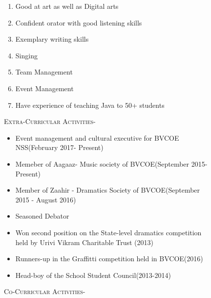 \documentclass[11pt]{article}
\begin{document}
\begin{figure}[ht]
\begin{minipage}[b]{0.45\linewidth}
\begin{small}
\begin{enumerate}
\item Good at art as well as Digital arts
\item Confident orator with good listening skills
\item Exemplary writing skills
\item Singing
\item Team Management
\item Event Management
\item Have experience of teaching Java to 50+ students
\end{enumerate}
\end{small}
\noindent\colorbox{WeakOrange}
{\parbox{\dimexpr\textwidth-2\fboxsep\relax}{\textsc{Extra-Curricular Activities-}}}
\begin{small}
\begin{itemize}
\item Event management and cultural executive for BVCOE NSS(February 2017- Present)
\item Memeber of Aagaaz- Music society of BVCOE(September 2015- Present)
\item Member of Zaahir - Dramatics Society of BVCOE(September 2015 - August 2016)
\item Seasoned Debator
\item Won second position on the State-level dramatics competition held by Urivi Vikram Charitable Trust (2013)
\item Runners-up in the Graffitti competition held in BVCOE(2016)  
\item Head-boy of the School Student Council(2013-2014) 
\end{itemize}
\end{small}
\noindent\colorbox{WeakOrange}
{\parbox{\dimexpr\textwidth-2\fboxsep\relax}{\textsc{Co-Curricular Activities-}}}


\end{minipage}
\end{figure}
\end{document}
